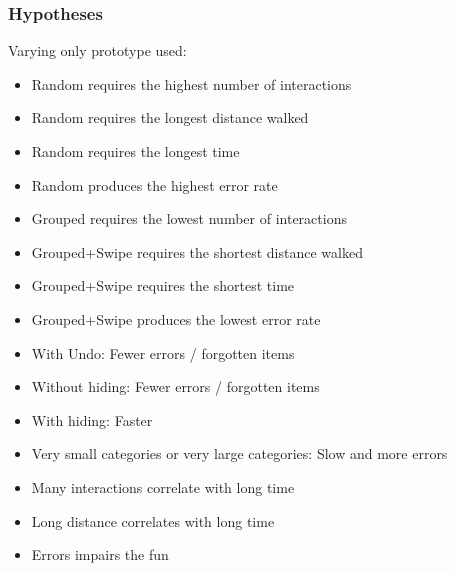 \documentclass{article}
\begin{document}
\begin{itemize}
\begin{itemize}
    \subsubsection{Hypotheses}
        Varying only prototype used:
        \begin{itemize}
            \item Random requires the highest number of interactions
            \item Random requires the longest distance walked 
            \item Random requires the longest time
            \item Random produces the highest error rate

            \item Grouped requires the lowest number of interactions

            \item Grouped+Swipe requires the shortest distance walked 
            \item Grouped+Swipe requires the shortest time
            \item Grouped+Swipe produces the lowest error rate
        \end{itemize}
        \begin{itemize}

            \item With Undo: Fewer errors / forgotten items
            \item Without hiding: Fewer errors / forgotten items
            \item With hiding: Faster

            \item Very small categories or very large categories: Slow and more errors

            \item Many interactions correlate with long time
            \item Long distance correlates with long time

            \item Errors impairs the fun

        \end{itemize}

\end{itemize}
\end{itemize}
\end{document}
